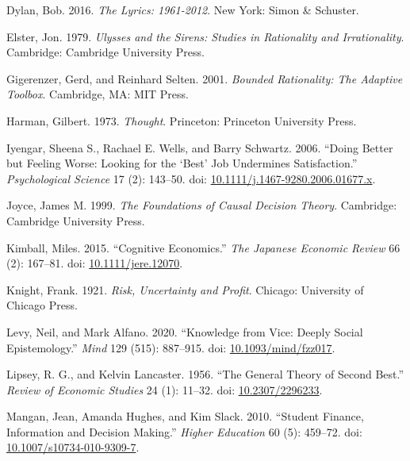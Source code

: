 \documentclass[
  10pt,
  letterpaper,
  DIV=11,
  numbers=noendperiod,
  twoside]{scrartcl}
\newlength{\cslhangindent}
\newenvironment{CSLReferences}[2] %
 {\begin{list}{}{%
  \setlength{\itemindent}{0pt}
  \setlength{\leftmargin}{0pt}
  \setlength{\parsep}{0pt}
  \ifodd #1
   \setlength{\leftmargin}{\cslhangindent}
   \setlength{\itemindent}{-1\cslhangindent}
  \fi
  \setlength{\itemsep}{#2\baselineskip}}}
 {\end{list}}
\begin{document}
\begin{CSLReferences}{1}{0}
Dylan, Bob. 2016. \emph{The Lyrics: 1961-2012}. New York: Simon \&
Schuster.

Elster, Jon. 1979. \emph{Ulysses and the Sirens: Studies in Rationality
and Irrationality}. Cambridge: Cambridge University Press.

Gigerenzer, Gerd, and Reinhard Selten. 2001. \emph{Bounded Rationality:
The Adaptive Toolbox}. Cambridge, MA: MIT Press.

Harman, Gilbert. 1973. \emph{Thought}. Princeton: Princeton University
Press.

Iyengar, Sheena S., Rachael E. Wells, and Barry Schwartz. 2006. {``Doing
Better but Feeling Worse: Looking for the {`Best'} Job Undermines
Satisfaction.''} \emph{Psychological Science} 17 (2): 143--50. doi:
\href{https://doi.org/10.1111/j.1467-9280.2006.01677.x}{10.1111/j.1467-9280.2006.01677.x}.

Joyce, James M. 1999. \emph{The Foundations of Causal Decision Theory}.
Cambridge: Cambridge University Press.

Kimball, Miles. 2015. {``Cognitive Economics.''} \emph{The Japanese
Economic Review} 66 (2): 167--81. doi:
\href{https://doi.org/10.1111/jere.12070}{10.1111/jere.12070}.

Knight, Frank. 1921. \emph{Risk, Uncertainty and Profit}. Chicago:
University of Chicago Press.

Levy, Neil, and Mark Alfano. 2020. {``Knowledge from Vice: Deeply Social
Epistemology.''} \emph{Mind} 129 (515): 887--915. doi:
\href{https://doi.org/10.1093/mind/fzz017}{10.1093/mind/fzz017}.

Lipsey, R. G., and Kelvin Lancaster. 1956. {``The General Theory of
Second Best.''} \emph{Review of Economic Studies} 24 (1): 11--32. doi:
\href{https://doi.org/10.2307/2296233}{10.2307/2296233}.

Mangan, Jean, Amanda Hughes, and Kim Slack. 2010. {``Student Finance,
Information and Decision Making.''} \emph{Higher Education} 60 (5):
459--72. doi:
\href{https://doi.org/10.1007/s10734-010-9309-7}{10.1007/s10734-010-9309-7}.


\end{CSLReferences}
\end{document}

